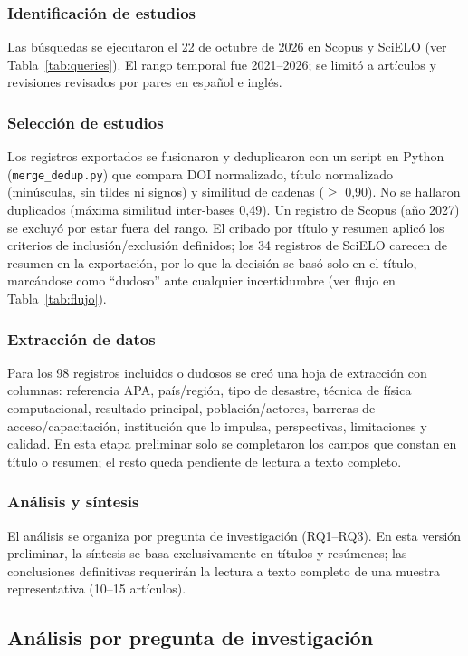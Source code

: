 \documentclass[12pt,a4paper]{article}
\begin{document}
\subsubsection{Identificación de estudios}
Las búsquedas se ejecutaron el 22 de octubre de 2026 en Scopus y SciELO (ver Tabla~\ref{tab:queries}). El rango temporal fue 2021--2026; se limitó a artículos y revisiones revisados por pares en español e inglés.

\subsubsection{Selección de estudios}
Los registros exportados se fusionaron y deduplicaron con un script en Python (\texttt{merge\_dedup.py}) que compara DOI normalizado, título normalizado (minúsculas, sin tildes ni signos) y similitud de cadenas ($\ge$ 0,90). No se hallaron duplicados (máxima similitud inter-bases 0,49). Un registro de Scopus (año 2027) se excluyó por estar fuera del rango. El cribado por título y resumen aplicó los criterios de inclusión/exclusión definidos; los 34 registros de SciELO carecen de resumen en la exportación, por lo que la decisión se basó solo en el título, marcándose como ``dudoso'' ante cualquier incertidumbre (ver flujo en Tabla~\ref{tab:flujo}).

\subsubsection{Extracción de datos}
Para los 98 registros incluidos o dudosos se creó una hoja de extracción con columnas: referencia APA, país/región, tipo de desastre, técnica de física computacional, resultado principal, población/actores, barreras de acceso/capacitación, institución que lo impulsa, perspectivas, limitaciones y calidad. En esta etapa preliminar solo se completaron los campos que constan en título o resumen; el resto queda pendiente de lectura a texto completo.

\subsubsection{Análisis y síntesis}
El análisis se organiza por pregunta de investigación (RQ1--RQ3). En esta versión preliminar, la síntesis se basa exclusivamente en títulos y resúmenes; las conclusiones definitivas requerirán la lectura a texto completo de una muestra representativa (10--15 artículos).

\subsection{Análisis por pregunta de investigación}
\end{document}
